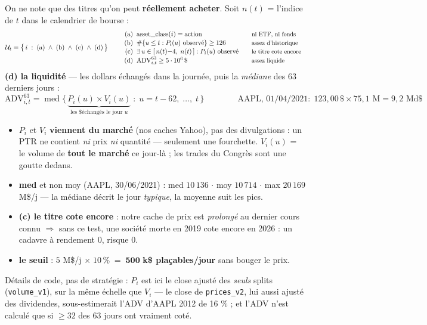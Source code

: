\documentclass[11pt,a4paper]{article}
\newcommand{\etape}[2]{\vspace{1.6mm}{\color{bleu}\large\bfseries É#1 --- #2}\vspace{0.3mm}\par}
\begin{document}
\etape{1}{L'univers tradable à la date $t$}
On ne note que des titres qu'on peut \textbf{réellement acheter}. Soit $n(t)$ = l'indice de $t$ dans le calendrier de bourse :
\[
\mathcal{U}_t = \bigl\{\, i \;:\; \text{(a)} \;\wedge\; \text{(b)} \;\wedge\; \text{(c)} \;\wedge\; \text{(d)} \,\bigr\}
\qquad
\begin{array}{r@{\;\;}l@{\qquad}l}
\text{(a)} & \text{asset\_class}(i) = \text{action} & \text{\small ni ETF, ni fonds} \\[0.4mm]
\text{(b)} & \#\{u \le t : P_i(u) \text{ observé}\} \ge 126 & \text{\small assez d'historique} \\[0.4mm]
\text{(c)} & \exists\, u \in [\,n(t){-}4,\; n(t)\,] : P_i(u) \text{ observé} & \text{\small le titre cote encore} \\[0.4mm]
\text{(d)} & \mathrm{ADV}^{63}_{i,t} \ge 5 \cdot 10^{6}\,\$ & \text{\small assez liquide}
\end{array}
\]
\textbf{(d) la liquidité} --- les dollars échangés dans la journée, puis la \emph{médiane} des 63 derniers jours :
\[
\mathrm{ADV}^{63}_{i,t} = \operatorname{med}\bigl\{\, \underbrace{P_i(u) \times V_i(u)}_{\text{les \$ échangés le jour } u} \;:\; u = t{-}62,\; \ldots,\; t \,\bigr\}
\qquad\qquad
\text{AAPL, } 01/04/2021 : \;123{,}00\,\$ \times 75{,}1\text{ M} = 9{,}2 \text{ Md\$}
\]
\begin{itemize}[itemsep=0pt, topsep=1pt, leftmargin=6mm]
\item $P_i$ et $V_i$ \textbf{viennent du marché} (nos caches Yahoo), pas des divulgations : un PTR ne contient \emph{ni} prix \emph{ni} quantité --- seulement une fourchette. $V_i(u)$ = le volume de \textbf{tout le marché} ce jour-là ; les trades du Congrès sont une goutte dedans.
\item \textbf{med} et non moy (AAPL, 30/06/2021) : med $10\,136$ $\cdot$ moy $10\,714$ $\cdot$ max $20\,169$ M\$/j --- la médiane décrit le jour \emph{typique}, la moyenne suit les pics.
\item \textbf{(c) le titre cote encore} : notre cache de prix est \emph{prolongé} au dernier cours connu $\Rightarrow$ sans ce test, une société morte en 2019 \og{} cote \fg{} encore en 2026 : un cadavre à rendement $0$, risque $0$.
\item \textbf{le seuil} : $5$ M\$/j $\times\; 10\,\% \;=\; \mathbf{500}$ \textbf{k\$ plaçables/jour} sans bouger le prix.
\end{itemize}
{\small\color{grisf} Détails de code, pas de stratégie : $P_i$ est ici le close ajusté des \emph{seuls} splits (\texttt{volume\_v1}), sur la même échelle que $V_i$ --- le close de \texttt{prices\_v2}, lui aussi ajusté des dividendes, sous-estimerait l'ADV d'AAPL 2012 de 16 \% ; et l'ADV n'est calculé que si $\ge 32$ des 63 jours ont vraiment coté.}
\end{document}
